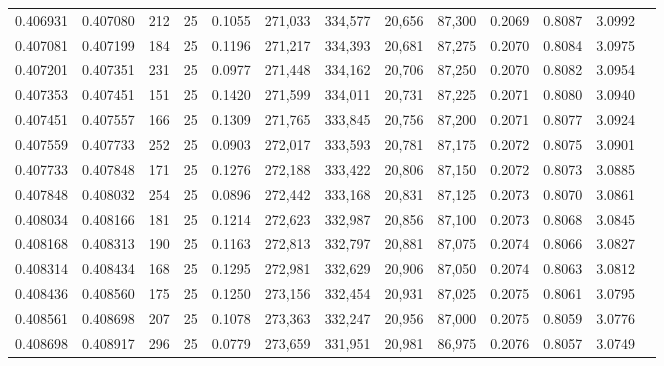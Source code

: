 \begin{tabular}{rrrrrrrrrrrrr}
0.406931 & 0.407080 &   212 &  25 &                                     0.1055 & 271,033 & 334,577 &  20,656 &  87,300 & 0.2069 & 0.8087 & 3.0992 \\
0.407081 & 0.407199 &   184 &  25 &                                     0.1196 & 271,217 & 334,393 &  20,681 &  87,275 & 0.2070 & 0.8084 & 3.0975 \\
0.407201 & 0.407351 &   231 &  25 &                                     0.0977 & 271,448 & 334,162 &  20,706 &  87,250 & 0.2070 & 0.8082 & 3.0954 \\
0.407353 & 0.407451 &   151 &  25 &                                     0.1420 & 271,599 & 334,011 &  20,731 &  87,225 & 0.2071 & 0.8080 & 3.0940 \\
0.407451 & 0.407557 &   166 &  25 &                                     0.1309 & 271,765 & 333,845 &  20,756 &  87,200 & 0.2071 & 0.8077 & 3.0924 \\
0.407559 & 0.407733 &   252 &  25 &                                     0.0903 & 272,017 & 333,593 &  20,781 &  87,175 & 0.2072 & 0.8075 & 3.0901 \\
0.407733 & 0.407848 &   171 &  25 &                                     0.1276 & 272,188 & 333,422 &  20,806 &  87,150 & 0.2072 & 0.8073 & 3.0885 \\
0.407848 & 0.408032 &   254 &  25 &                                     0.0896 & 272,442 & 333,168 &  20,831 &  87,125 & 0.2073 & 0.8070 & 3.0861 \\
0.408034 & 0.408166 &   181 &  25 &                                     0.1214 & 272,623 & 332,987 &  20,856 &  87,100 & 0.2073 & 0.8068 & 3.0845 \\
0.408168 & 0.408313 &   190 &  25 &                                     0.1163 & 272,813 & 332,797 &  20,881 &  87,075 & 0.2074 & 0.8066 & 3.0827 \\
0.408314 & 0.408434 &   168 &  25 &                                     0.1295 & 272,981 & 332,629 &  20,906 &  87,050 & 0.2074 & 0.8063 & 3.0812 \\
0.408436 & 0.408560 &   175 &  25 &                                     0.1250 & 273,156 & 332,454 &  20,931 &  87,025 & 0.2075 & 0.8061 & 3.0795 \\
0.408561 & 0.408698 &   207 &  25 &                                     0.1078 & 273,363 & 332,247 &  20,956 &  87,000 & 0.2075 & 0.8059 & 3.0776 \\
0.408698 & 0.408917 &   296 &  25 &                                     0.0779 & 273,659 & 331,951 &  20,981 &  86,975 & 0.2076 & 0.8057 & 3.0749 \\

\end{tabular}
